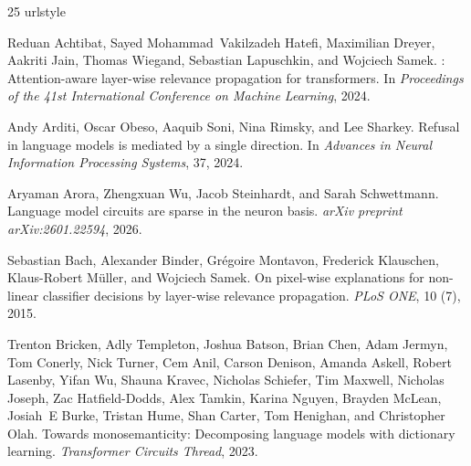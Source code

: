 \documentclass[11pt]{article}
\begin{document}

\begin{thebibliography}{25}
\providecommand{\natexlab}[1]{#1}
\providecommand{\url}[1]{\texttt{#1}}
\expandafter\ifx\csname urlstyle\endcsname\relax
  \providecommand{\doi}[1]{doi: #1}\else
  \providecommand{\doi}{doi: \begingroup \urlstyle{rm}\Url}\fi

Reduan Achtibat, Sayed Mohammad~Vakilzadeh Hatefi, Maximilian Dreyer, Aakriti
  Jain, Thomas Wiegand, Sebastian Lapuschkin, and Wojciech Samek.
: Attention-aware layer-wise relevance propagation for
  transformers.
\newblock In \emph{Proceedings of the 41st International Conference on Machine
  Learning}, 2024.

Andy Arditi, Oscar Obeso, Aaquib Soni, Nina Rimsky, and Lee Sharkey.
\newblock Refusal in language models is mediated by a single direction.
\newblock In \emph{Advances in Neural Information Processing Systems}, 37, 2024.

Aryaman Arora, Zhengxuan Wu, Jacob Steinhardt, and Sarah Schwettmann.
\newblock Language model circuits are sparse in the neuron basis.
\newblock \emph{arXiv preprint arXiv:2601.22594}, 2026.

Sebastian Bach, Alexander Binder, Gr{\'e}goire Montavon, Frederick Klauschen,
  Klaus-Robert M{\"u}ller, and Wojciech Samek.
\newblock On pixel-wise explanations for non-linear classifier decisions by
  layer-wise relevance propagation.
\newblock \emph{PLoS ONE}, 10 (7), 2015.

Trenton Bricken, Adly Templeton, Joshua Batson, Brian Chen, Adam Jermyn, Tom
  Conerly, Nick Turner, Cem Anil, Carson Denison, Amanda Askell, Robert
  Lasenby, Yifan Wu, Shauna Kravec, Nicholas Schiefer, Tim Maxwell, Nicholas
  Joseph, Zac Hatfield-Dodds, Alex Tamkin, Karina Nguyen, Brayden McLean,
  Josiah~E Burke, Tristan Hume, Shan Carter, Tom Henighan, and Christopher
  Olah.
\newblock Towards monosemanticity: Decomposing language models with dictionary
  learning.
\newblock \emph{Transformer Circuits Thread}, 2023.


\end{thebibliography}
\end{document}
